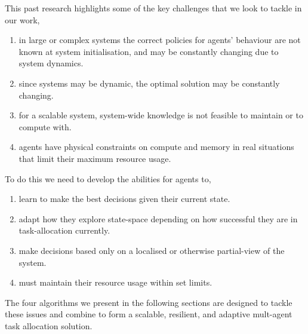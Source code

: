 This past research highlights some of the key challenges that we look to tackle in our work,
\begin{enumerate}
	\item in large or complex systems the correct policies for agents' behaviour are not known at system initialisation, and may be constantly changing due to system dynamics.
	\item since systems may be dynamic, the optimal solution may be constantly changing.
	\item for a scalable system, system-wide knowledge is not feasible to maintain or to compute with.
	\item agents have physical constraints on compute and memory in real situations that limit their maximum resource usage.
\end{enumerate}
To do this we need to develop the abilities for agents to,
\begin{enumerate}
	\item learn to make the best decisions given their current state.
	\item adapt how they explore state-space depending on how successful they are in task-allocation currently.
	\item make decisions based only on a localised or otherwise partial-view of the system.
	\item must maintain their resource usage within set limits.
\end{enumerate}
The four algorithms we present in the following sections are designed to tackle these issues and combine to form a scalable, resilient, and adaptive mult-agent task allocation solution.